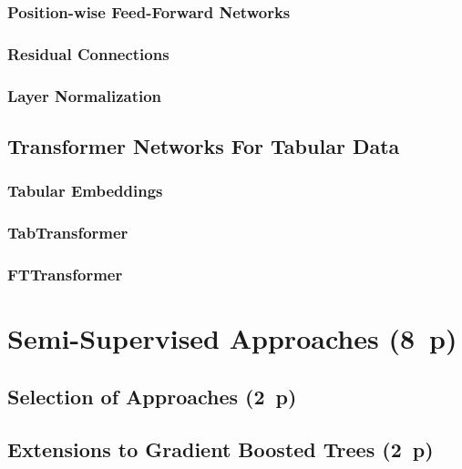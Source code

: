 \subsubsection{Position-wise Feed-Forward Networks}\label{sec:position-wise-ffn}

\subsubsection{Residual Connections}\label{sec:residual-connections}

\subsubsection{Layer Normalization}\label{sec:layer-norm}

\subsection{Transformer Networks For Tabular Data}\label{sec:tabular-transformer}

\subsubsection{Tabular Embeddings}\label{sec:tabular-embeddings}

\subsubsection{TabTransformer}\label{sec:tabtransformer}

\subsubsection{FTTransformer}\label{sec:fttransformer}


\newpage
\section{Semi-Supervised Approaches (8~p)}\label{sec:semi-supervised-approaches}

\subsection{Selection of Approaches (2~p)}\label{sec:selection-of-approaches-1}

\subsection{Extensions to Gradient Boosted
  Trees (2~p)}\label{sec:extensions-to-gradient-boosted-trees}

